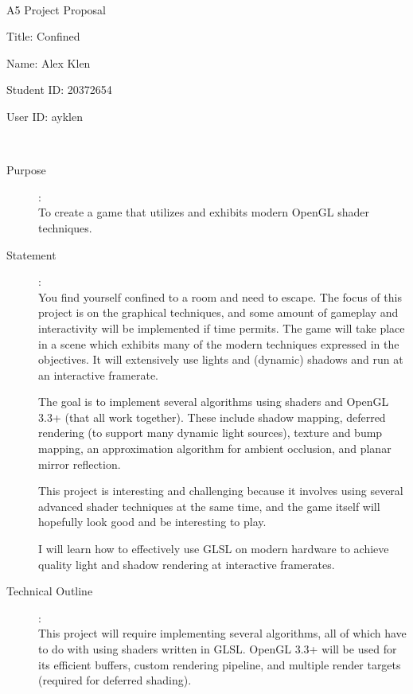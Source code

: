 \documentclass {article}
\begin{document}
~\vfill
\begin{center}
  \Large

  A5 Project Proposal

  Title: Confined

  Name: Alex Klen

  Student ID: 20372654

  User ID: ayklen
\end{center}
\vfill ~\vfill~
\newpage
{}
\begin{description}
  \item[Purpose]:\\
    To create a game that utilizes and exhibits modern OpenGL shader techniques.

  \item[Statement]:\\
    You find yourself confined to a room and need to escape. The focus of this project is on the graphical techniques, and some amount of gameplay and interactivity will be implemented if time permits.
    The game will take place in a scene which exhibits many of the modern techniques expressed in the objectives.
    It will extensively use lights and (dynamic) shadows and run at an interactive framerate.

    The goal is to implement several algorithms using shaders and OpenGL 3.3+ (that all work together).
    These include shadow mapping, deferred rendering (to support many dynamic light sources), texture and bump mapping, an approximation algorithm for ambient occlusion, and planar mirror reflection.

    This project is interesting and challenging because it involves using several advanced shader techniques at the same time, and the game itself will hopefully look good and be interesting to play.

    I will learn how to effectively use GLSL on modern hardware to achieve quality light and shadow rendering at interactive framerates.

  \item[Technical Outline]:\\
    This project will require implementing several algorithms, all of which have to do with using shaders written in GLSL.
    OpenGL 3.3+ will be used for its efficient buffers, custom rendering pipeline, and multiple render targets (required for deferred shading).


\end{description}
\end{document}
